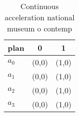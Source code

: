 \documentclass[a4paper]{article}
\begin{document}
\begin{table}
\begin{adjustbox}{width=1\columnwidth}
\begin{tabular}{|l|l|l|}
\hline
\textbf{plan} & \multicolumn{1}{c|}{\textbf{0}} & \multicolumn{1}{c|}{\textbf{1}} \\ \hline
\textbf{$a_0$}  & (0,0) & (1,0) \\ \hline
\textbf{$a_1$}  & (0,0) & (1,0) \\ \hline
\textbf{$a_2$}  & (0,0) & (1,0) \\ \hline
\textbf{$a_3$}  & (0,0) & (1,0) \\ \hline
\end{tabular}
\end{adjustbox}
\caption{Continuous acceleration national museum o contemp
}
\end{table}
\end{document}
